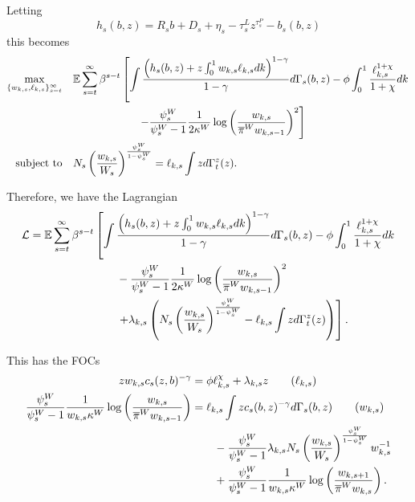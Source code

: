Letting
\begin{equation*}
    h_s(b, z) = R_s b + D_s + \eta_s - \tau_s^L z^{\tau_s^P} - b_s (b, z)
\end{equation*}
this becomes
\begin{alignat*}{4}
    \max_{\{w_{k, s}, \ell_{k, s}\}_{s = t}^\infty} \quad & \mathbb{E} \sum_{s = t}^\infty \beta^{s - t} \left[ \int \frac{\left(h_s(b, z) + z \int_0^1  w_{k, s} \ell_{k, s} dk \right)^{1 - \gamma}}{1 - \gamma} d\Gamma_s(b, z) - \phi \int_0^1 \frac{\ell_{k, s}^{1 + \chi}}{1 + \chi} dk\right. \\
    & \qquad\qquad\qquad \left.- \frac{\psi_s^W}{\psi_s^W - 1} \frac{1}{2 \kappa^W} \log\left(\frac{w_{k, s}}{\overline{\pi}^W w_{k, s-1}}\right)^2\right] \\
    \text{subject to} \quad & N_s \left(\frac{w_{k, s}}{W_s}\right)^\frac{\psi_s^W}{1 - \psi_s^W} = \ell_{k, s} \int z d\Gamma_t^z(z).
\end{alignat*}

Therefore, we have the Lagrangian
\begin{align*}
    \mathcal{L} = \mathbb{E} \sum_{s = t}^\infty \beta^{s - t} &\left[ \int \frac{\left(h_s(b, z) + z \int_0^1  w_{k, s} \ell_{k, s} dk \right)^{1 - \gamma}}{1 - \gamma} d\Gamma_s(b, z) - \phi \int_0^1 \frac{\ell_{k, s}^{1 + \chi}}{1 + \chi} dk\right. \\
    & \qquad - \frac{\psi_s^W}{\psi_s^W - 1} \frac{1}{2 \kappa^W} \log\left(\frac{w_{k, s}}{\overline{\pi}^W w_{k, s-1}}\right)^2 \\
    & \qquad \left.+ \lambda_{k, s} \left(N_s \left(\frac{w_{k, s}}{W_s}\right)^\frac{\psi_s^W}{1 - \psi_s^W} - \ell_{k, s} \int z d\Gamma_t^z(z)\right)\right].
\end{align*}

This has the FOCs
\begin{align*}
    z w_{k, s} c_s (z, b)^{-\gamma} &= \phi \ell_{k, s}^\chi + \lambda_{k, s} z \tag{$\ell_{k, s}$} \\
    \frac{\psi_s^W}{\psi_s^W - 1} \frac{1}{w_{k, s} \kappa^W} \log \left(\frac{w_{k, s}}{\overline{\pi}^W w_{k, s-1}}\right) &= \ell_{k, s} \int z c_s(b, z)^{-\gamma} d \Gamma_s(b, z) \tag{$w_{k, s}$} \\
    & \qquad - \frac{\psi_s^W}{\psi_s^W - 1}  \lambda_{k, s} N_s \left(\frac{w_{k, s}}{W_s}\right)^\frac{\psi_s^W}{1 - \psi_s^W} w_{k, s}^{-1} \\
    & \qquad + \frac{\psi_s^W}{\psi_s^W - 1} \frac{1}{w_{k, s} \kappa^W} \log \left(\frac{w_{k, s+1}}{\overline{\pi}^W w_{k, s}}\right).
\end{align*}

